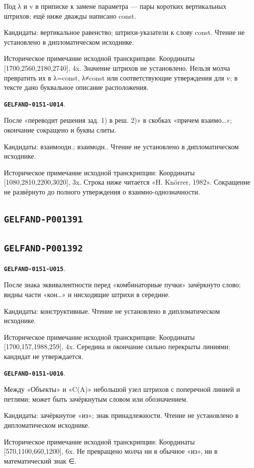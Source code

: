 \documentclass[11pt]{article}
\theoremstyle{definition}
\theoremstyle{remark}
\begin{document}
Под λ и v в приписке к замене параметра — пары коротких вертикальных штрихов; ещё ниже дважды написано const.\par
Кандидаты: вертикальное равенство; штрихи-указатели к слову const. Чтение не установлено в дипломатическом исходнике.\par
Историческое примечание исходной транскрипции: Координаты [1700,2560,2180,2740], 4x. Значение штрихов не установлено. Нельзя молча превратить их в λ=const, λ≠const или соответствующие утверждения для v; в тексте дано буквальное описание расположения.\par\medskip
\par\noindent\leavevmode{}\label{GELFAND-0151-U014}\label{GELFAND-P001390:bijection-note:note}\textbf{\texttt{GELFAND-0151-U014}}.\nopagebreak[4]\par
После «переводит решения зад. 1) в реш. 2)» в скобках «причем взаимо…»; окончание сокращено и буквы слиты.\par
Кандидаты: взаимоодн.; взаимодн.. Чтение не установлено в дипломатическом исходнике.\par
Историческое примечание исходной транскрипции: Координаты [1080,2810,2200,3020], 3x. Строка ниже читается «H. Knörrer, 1982». Сокращение не развёрнуто до полного утверждения о взаимно-однозначности.\par\medskip
\subsection*{\texttt{GELFAND-P001391}}
\subsection*{\texttt{GELFAND-P001392}}
\par\noindent\leavevmode{}\label{GELFAND-0151-U015}\label{GELFAND-P001392:cancelled-equivalence:note}\textbf{\texttt{GELFAND-0151-U015}}.\nopagebreak[4]\par
После знака эквивалентности перед «комбинаторные пучки» зачёркнуто слово; видны части «кон…» и нисходящие штрихи в середине.\par
Кандидаты: конструктивные. Чтение не установлено в дипломатическом исходнике.\par
Историческое примечание исходной транскрипции: Координаты [1700,157,1988,259], 4x. Середина и окончание сильно перекрыты линиями; кандидат не утверждается.\par\medskip
\par\noindent\leavevmode{}\label{GELFAND-0151-U016}\label{GELFAND-P001392:objects-mark:note}\textbf{\texttt{GELFAND-0151-U016}}.\nopagebreak[4]\par
Между «Объекты» и «C(A)» небольшой узел штрихов с поперечной линией и петлями; может быть зачёркнутым словом или обозначением.\par
Кандидаты: зачёркнутое «из»; знак принадлежности. Чтение не установлено в дипломатическом исходнике.\par
Историческое примечание исходной транскрипции: Координаты [570,1100,660,1200], 6x. Не превращено молча ни в обычное «из», ни в математический знак ∈.\par\medskip
\end{document}
